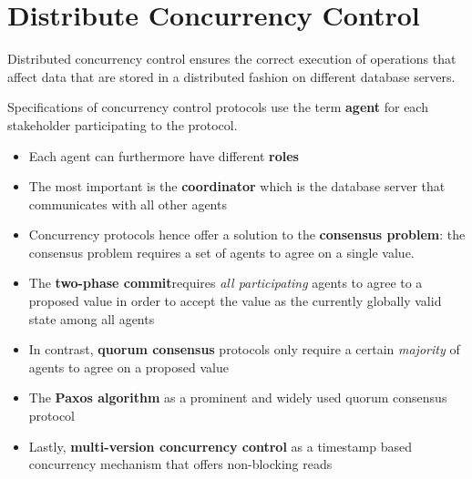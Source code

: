 \chapter{Distribute Concurrency Control}

Distributed concurrency control ensures the correct execution of operations that affect data that are
stored in a distributed fashion on different database servers.

Specifications of concurrency control protocols use the term \textbf{agent} for each stakeholder participating to the protocol.
\begin{itemize}
    \item Each agent can furthermore have different \textbf{roles}
    \item The most important is the \textbf{coordinator} which is the database server that communicates with all other agents
    \item Concurrency protocols hence offer a solution to the \textbf{consensus problem}: the consensus problem requires a set of agents to agree on a single value.
\end{itemize}

\begin{tcolorbox}
\begin{itemize}
    \item The \textbf{two-phase commit}requires \textit{all participating} agents to agree to a proposed value in order to accept the value as the currently globally valid state among all agents
    \item In contrast, \textbf{quorum consensus} protocols only require a certain \textit{majority} of agents to agree on a proposed value
    \item The \textbf{Paxos algorithm} as a prominent and widely used quorum consensus protocol
    \item Lastly, \textbf{multi-version concurrency control} as a timestamp based concurrency mechanism that offers non-blocking reads
\end{itemize}
\end{tcolorbox}

